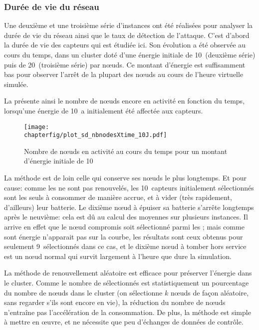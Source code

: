         \subsubsection{Durée de vie du réseau}
Une deuxième et une troisième série d'instances ont été réalisées pour analyser la durée de vie du réseau ainsi que le taux de détection de l'attaque.
C'est d'abord la durée de vie des capteurs qui est étudiée ici.
Son évolution a été observée au cours du temps, dans un cluster doté d'une énergie initiale de 10~\joule (deuxième série) puis de 20~\joule (troisième série) par nœuds.
Ce montant d'énergie est suffisamment bas pour observer l'arrêt de la plupart des nœuds au cours de l'heure virtuelle simulée.

La  présente ainsi le nombre de nœuds encore en activité en fonction du temps, lorsqu'une énergie de 10~\joule a initialement été affectée aux capteurs.
\begin{figure}[!ht]
    \centering
    \texttt{[image: \\chapterfig/plot\_sd\_nbnodesXtime\_10J.pdf]}
    \caption{Nombre de nœuds en activité au cours du temps pour un montant d'énergie initiale de 10~\joule}\label{sd:fig:nbnodes-10J}
\end{figure}
La méthode \idstat est de loin celle qui conserve ses nœuds le plus longtemps.
Et pour cause: comme les \cns ne sont pas renouvelés, les 10~capteurs initialement sélectionnés sont les seuls à consommer de manière accrue, et à vider (très rapidement, d'ailleurs) leur batterie.
Le dixième nœud à épuiser sa batterie s'arrête longtemps après le neuvième: cela est dû au calcul des moyennes sur plusieurs instances.
Il arrive en effet que le nœud compromis soit sélectionné parmi les \cns; mais comme sont énergie n'apparait pas sur la courbe, les résultats sont ceux obtenus pour seulement 9~\cns sélectionnés dans ce cas, et le dixième nœud à tomber hors service est un nœud normal qui survit largement à l'heure que dure la simulation.

La méthode de renouvellement aléatoire \idrand est efficace pour préserver l'énergie dans le cluster.
Comme le nombre de \cns sélectionnés est statistiquement un pourcentage du nombre de nœuds dans le cluster (on sélectionne $k$ nœuds de façon aléatoire, sans regarder s'ils sont encore en vie), la réduction du nombre de nœuds n'entraîne pas l'accélération de la consommation.
De plus, la méthode est simple à mettre en œuvre, et ne nécessite que peu d'échanges de données de contrôle.

